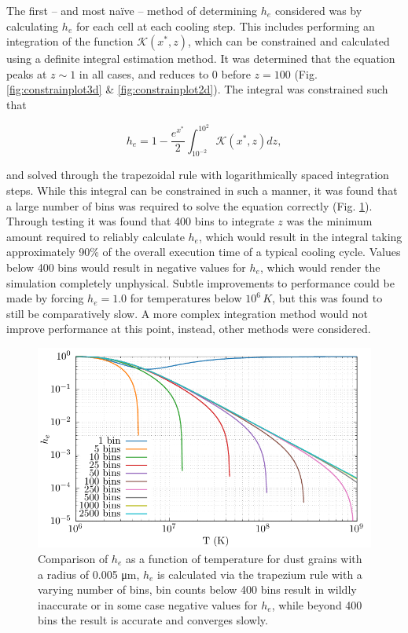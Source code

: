 The first -- and most na\"ive -- method of determining $h_e$ considered was by calculating $h_e$ for each cell at each cooling step.
This includes performing an integration of the function $\mathcal{K}(x^*,z)$, which can be constrained and calculated using a definite integral estimation method.
It was determined that the equation peaks at $z \sim 1$ in all cases, and reduces to $0$ before $z=100$ (Fig. \ref{fig:constrainplot3d} \& \ref{fig:constrainplot2d}).
The integral was constrained such that

\begin{equation}
  h_e = 1 - \frac{e^{x^*}}{2} \int^{10^2}_{10^{-2}} \mathcal{K}(x^*,z) dz,
\end{equation}

\noindent
and solved through the trapezoidal rule with logarithmically spaced integration steps.
While this integral can be constrained in such a manner, it was found that a large number of bins was required to solve the equation correctly (Fig. \ref{fig:he-accuracy-bins}).
Through testing it was found that 400 bins to integrate $z$ was the minimum amount required to reliably calculate $h_e$, which would result in the integral taking approximately 90\% of the overall execution time of a typical cooling cycle.
Values below 400 bins would result in negative values for $h_{e}$, which would render the simulation completely unphysical.
Subtle improvements to performance could be made by forcing $h_{e} = 1.0$ for temperatures below $10^6 \, \si{K}$, but this was found to still be comparatively slow.
A more complex integration method would not improve performance at this point, instead, other methods were considered.

\begin{figure}[ht]
  \centering
  \includegraphics{assets/he_accuracy/he_acc.pdf}
  \caption[$h_e$ integration accuracy comparison]{Comparison of $h_e$ as a function of temperature for dust grains with a radius of 0.005 \si{\micro\metre}, $h_e$ is calculated via the trapezium rule with a varying number of bins, bin counts below 400 bins result in wildly inaccurate or in some case negative values for $h_e$, while beyond 400 bins the result is accurate and converges slowly.}
  \label{fig:he-accuracy-bins}
\end{figure}

